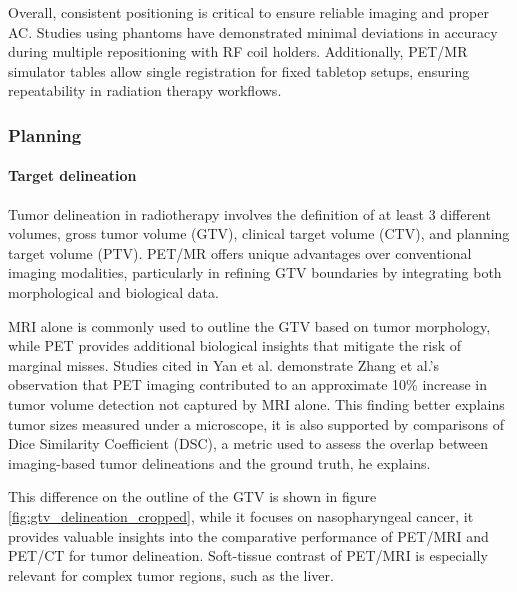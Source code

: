\documentclass[11pt]{article} %
\begin{document}
\begin{multicols}{2}
Overall, consistent positioning is critical to ensure reliable imaging and proper AC. Studies using phantoms have demonstrated minimal deviations in accuracy during multiple repositioning with RF coil holders. Additionally, PET/MR simulator tables allow single registration for fixed tabletop setups, ensuring repeatability in radiation therapy workflows.

\subsubsection{Planning}

\paragraph{Target delineation}
Tumor delineation in radiotherapy involves the definition of at least 3 different volumes, gross tumor volume (GTV), clinical target volume (CTV), and planning target volume (PTV). PET/MR offers unique advantages over conventional imaging modalities, particularly in refining GTV boundaries by integrating both morphological and biological data.


MRI alone is commonly used to outline the GTV based on tumor morphology, while PET provides additional biological insights that mitigate the risk of marginal misses. Studies cited in Yan et al. demonstrate Zhang et al.’s %
observation that PET imaging contributed to an approximate 10\% increase in tumor volume detection not captured by MRI alone.\cite{yan2024} This finding better explains tumor sizes measured under a microscope, it is also supported by comparisons of Dice Similarity Coefficient (DSC), a metric used to assess the overlap between imaging-based tumor delineations and the ground truth, he explains.%

This difference on the outline of the GTV is shown in figure \ref{fig:gtv_delineation_cropped}, while it focuses on nasopharyngeal cancer, it provides valuable insights into the comparative performance of PET/MRI and PET/CT for tumor delineation. Soft-tissue contrast of PET/MRI is especially relevant for complex tumor regions, such as the liver.





\end{multicols}
\end{document}
